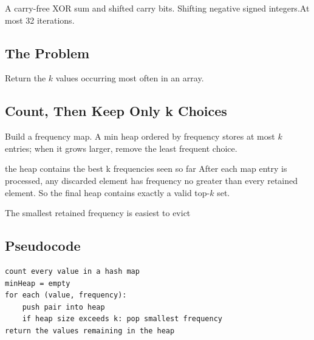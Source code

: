   {A carry-free XOR sum and shifted carry bits.}
  {Shifting negative signed integers.}{At most 32 iterations.}



\subsection{The Problem}
Return the \(k\) values occurring most often in an array.

\subsection{Count, Then Keep Only k Choices}
Build a frequency map. A min heap ordered by frequency stores at most \(k\)
entries; when it grows larger, remove the least frequent choice.

\begin{invariantbox}{the heap contains the best k frequencies seen so far}
After each map entry is processed, any discarded element has frequency no
greater than every retained element. So the final heap contains exactly a
valid top-\(k\) set.
\end{invariantbox}

\begin{visualbox}{The smallest retained frequency is easiest to evict}
\centering
{}
\end{visualbox}

\subsection{Pseudocode}
\begin{lstlisting}[style=pseudocode]
count every value in a hash map
minHeap = empty
for each (value, frequency):
    push pair into heap
    if heap size exceeds k: pop smallest frequency
return the values remaining in the heap
\end{lstlisting}

